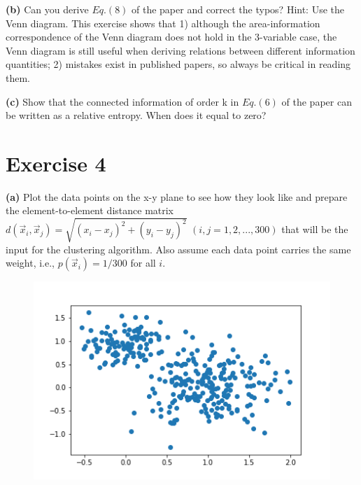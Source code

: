 \documentclass[11pt]{article}
\begin{document}
\begin{tcolorbox}
\textbf{(b)}
Can you derive $Eq. (8)$ of the paper and correct the typos? Hint: Use the
Venn diagram. This exercise shows that 1) although the area-information
correspondence of the Venn diagram does not hold in the 3-variable case, the Venn
diagram is still useful when deriving relations between different information
quantities; 2) mistakes exist in published papers, so always be critical in reading them.
\end{tcolorbox}

\begin{tcolorbox}
\textbf{(c)}
Show that the connected information of order k in $Eq. (6)$ of the paper
can be written as a relative entropy. When does it equal to zero?
\end{tcolorbox}
\pagebreak

\section{Exercise 4}
\begin{tcolorbox}
\textbf{(a)}
Plot the data points on the x-y plane to see how they look like and
prepare the element-to-element distance matrix $d(\vec{x}_{i},\vec{x}_{j}) = \sqrt{{(x_{i}- x_{j})}^{2}+ {(y_{i}-y_{j})}^{2}}$
$(i,j = 1,2,...,300)$ that will be the input for the clustering algorithm. Also assume each data point carries the same weight, i.e., $p(\vec{x}_{i}) = 1/300$ for all $i$.
\end{tcolorbox}
\begin{figure}[h]
	\includegraphics[width=\linewidth]{scatter_plot.png}
\end{figure}
\end{document}

